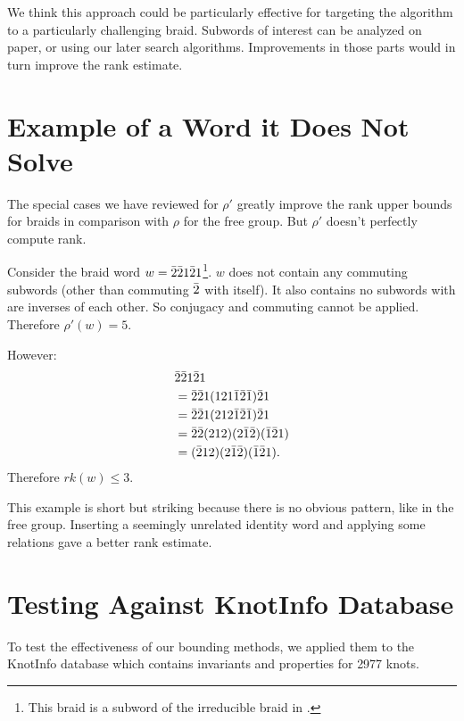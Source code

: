 \documentclass[12pt]{thesis}
\begin{document}
We think this approach could be particularly effective for targeting
the algorithm to a particularly challenging braid.
Subwords of interest can be analyzed on paper, or using our later search algorithms.
Improvements in those parts would in turn improve the rank estimate.

\section{Example of a Word it Does Not Solve}

The special cases we have reviewed for $\rho'$ greatly improve the rank upper bounds
for braids in comparison with $\rho$ for the free group.
But $\rho'$ doesn't perfectly compute rank.

\begin{example}
    \label{ex:does-not-solve}
    Consider the braid word $w = \bar{2} \bar{2} 1 \bar{2} 1$\footnote{This braid is a subword of the irreducible braid in \cite{irreducible-braid}.}.
    $w$ does not contain any commuting subwords
    (other than commuting $\bar{2}$ with itself).
    It also contains no subwords with are inverses of each other.
    So conjugacy and commuting cannot be applied.
    Therefore $\rho'(w) = 5$.

    However:
    \[
        \begin{split}
            &\bar{2} \bar{2} 1 \bar{2} 1 \\
            &=\bar{2} \bar{2} 1 (1 2 1 \bar{1} \bar{2} \bar{1}) \bar{2} 1  \\
            &=\bar{2} \bar{2} 1 (2 1 2 \bar{1} \bar{2} \bar{1}) \bar{2} 1  \\
            &=\bar{2} \bar{2} (2 1 2) (2 \bar{1} \bar{2}) (\bar{1} \bar{2} 1)  \\
            &= (\bar{2} 1 2) (2 \bar{1} \bar{2}) (\bar{1} \bar{2} 1).  \\
        \end{split}
    \]  
    Therefore $rk(w) \leq 3$.
\end{example}

This example is short but striking because
there is no obvious pattern, like in the free group.
Inserting a seemingly unrelated identity word
and applying some relations gave a better rank estimate.

\section{Testing Against KnotInfo Database}
\begin{sloppypar}
To test the effectiveness of our bounding methods,
we applied them to the KnotInfo database \cite{knotinfo} which contains invariants and properties for 2977 knots.
\end{sloppypar}
\end{document}
